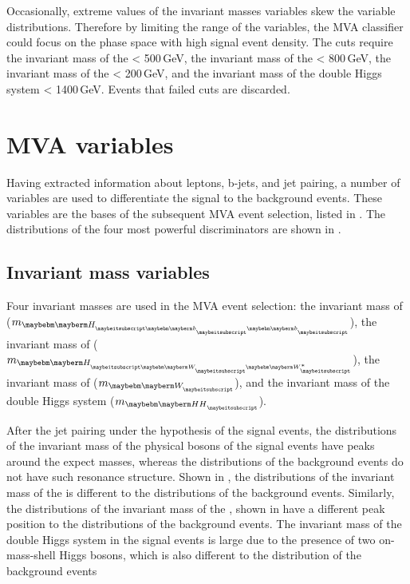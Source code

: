 Occasionally, extreme values of the invariant masses variables skew the variable distributions. Therefore by limiting the range of the variables, the MVA classifier could focus on the phase space with high signal event density. The cuts require the invariant mass of the \Hbb < 500\,GeV, the invariant mass of the \HWW < 800\,GeV, the invariant mass of the \PW < 200\,GeV, and the invariant mass of the double Higgs system < 1400\,GeV. Events that failed cuts are discarded.



\section{MVA variables}

Having extracted information about leptons, b-jets, and jet pairing, a number of variables are used to differentiate the signal to the background events. These variables are the bases of the subsequent MVA event selection, listed in . The distributions of the four most powerful discriminators are shown in .

\subsection{Invariant mass  variables}

Four invariant masses are used in the MVA event selection: the invariant mass of  \Hbb ($m_{\Hbb}$), the invariant mass of  \HWW ($m_{\HWW}$), the invariant mass of  \PW ($m_{\PW}$), and the invariant mass of the double Higgs system ($m_{\HH}$).

After the jet pairing under the hypothesis of the signal events, the distributions of the invariant mass of the physical bosons of the signal events have peaks around the expect masses, whereas the distributions of the  background events do not have such resonance structure. Shown in , the distributions of the invariant mass of the \Hbb is  different to the distributions of the background events. Similarly, the distributions of the invariant mass of the \HWW, shown in  have a different peak position to the distributions of the background events.  The invariant mass of the double Higgs system in the signal events is large due to the presence of two on-mass-shell Higgs bosons, which is also different to the distribution of the background events

